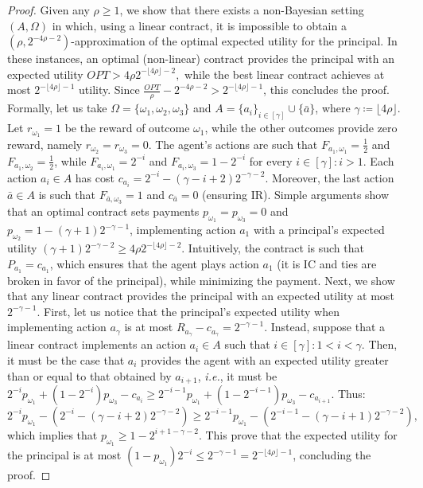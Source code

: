 \begin{proof}
	Given any $\rho \ge 1$, we show that there exists a non-Bayesian setting $(A,\Omega)$ in which, using a linear contract, it is impossible to obtain a $\left( \rho, 2^{-4 \rho -2} \right)$-approximation of the optimal expected utility for the principal.
	In these instances, an optimal (non-linear) contract provides the principal with an expected utility $OPT > 4\rho 2^{-\lfloor4 \rho\rfloor-2},$ while the best linear contract achieves at most $2^{-\lfloor 4  \rho\rfloor-1}$ utility.
	Since $\frac{ OPT}{\rho} -2^{-4 \rho -2}>2^{-\lfloor 4  \rho\rfloor-1}$, this concludes the proof.
	Formally, let us take $\Omega=\{\omega_1, \omega_2,\omega_3\}$ and $A=\{a_i\}_{i \in [\gamma]} \cup \{ \bar a \}$, where $\gamma \coloneqq \lfloor 4 \rho \rfloor$.
	Let $r_{\omega_1} = 1$ be the reward of outcome $\omega_1$, while the other outcomes provide zero reward, namely $r_{\omega_2} = r_{\omega_3} = 0$.
	The agent's actions are such that $F_{a_1,\omega_1}=\frac{1}{2}$ and $F_{a_1,\omega_2}=\frac{1}{2}$, while $F_{a_i,\omega_1}=2^{-i}$ and  $F_{a_i,\omega_3}=1-2^{-i}$ for every $i\in [\gamma]: i > 1$.
	Each action $a_i \in A$ has cost $c_{a_i}=2^{-i}-(\gamma-i+2)2^{-\gamma-2}$.
	Moreover, the last action $\bar a \in A$ is such that $F_{\bar a,\omega_3}=1$ and $c_{\bar a} = 0$ (ensuring IR).
	Simple arguments show that an optimal contract sets payments $p_{\omega_1} = p_{\omega_3} = 0$ and $p_{\omega_2}=1-(\gamma + 1) 2^{-\gamma-1}$, implementing action $a_1$ with a principal's expected utility $(\gamma+1) 2^{-\gamma-2}\ge 4\rho2^{-\lfloor 4  \rho \rfloor-2}$.
	Intuitively, the contract is such that $P_{a_1} = c_{a_1}$, which ensures that the agent plays action $a_1$ (it is IC and ties are broken in favor of the principal), while minimizing the payment.
	Next, we show that any linear contract provides the principal with an expected utility at most $2^{-\gamma-1}$.
	First, let us notice that the principal's expected utility when implementing action $a_\gamma$ is at most $R_{a_\gamma}-c_{a_\gamma}=2^{-\gamma-1}$.
	Instead, suppose that a linear contract implements an action $a_{i} \in A$ such that $i \in [\gamma] : 1 < i < \gamma$.
	Then, it must be the case that $a_{i}$ provides the agent with an expected utility greater than or equal to that obtained by $a_{i+1}$, \emph{i.e.}, it must be $2^{-i} p_{\omega_1}+ \left( 1-2^{-i} \right)	p_{\omega_3} -c_{a_i} \geq 2^{-i-1} p_{\omega_1} + \left( 1-2^{-i-1} \right)	p_{\omega_3} - c_{a_{i+1}}$. Thus: 
	\[
		2^{-i} p_{\omega_1} - \left( 2^{-i}-(\gamma-i+2) 2^{-\gamma-2} \right) \ge 2^{-i-1} p_{\omega_1} - \left( 2^{-i-1}-(\gamma-i+1) 2^{-\gamma-2} \right), 
	\]
	which implies that $p_{\omega_1}\ge 1-2^{i+1-\gamma-2}$.
	This prove that the expected utility for the principal is at most $\left( 1-p_{\omega_1} \right) 2^{-i}\le 2^{-\gamma-1}=2^{-\lfloor 4 \rho \rfloor-1} $, concluding the proof.
\end{proof}

